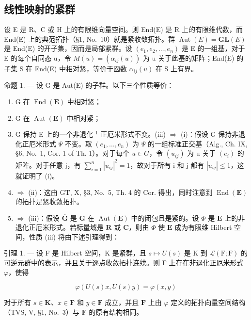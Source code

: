 \subsection{线性映射的紧群}

设 E 是 R、C 或 H 上的有限维向量空间。则 End(E) 是 R 上的有限维代数，而 End(E) 上的典范拓扑（§1, No.~10）就是紧收敛拓扑。群 \(\operatorname{Aut}(E) = \mathbf{GL}(E)\) 是 End(E) 的开子集，因而是局部紧群。设 \((e_{1}, e_{2}, \ldots, e_{n})\) 是 E 的一组基，对于 E 的每个自同态 u，令 \(M(u) = (\alpha_{ij}(u))\) 为 u 关于此基的矩阵；End(E) 的子集 S 在 End(E) 中相对紧，等价于函数 \(\alpha_{ij}(u)\) 在 S 上有界。

命题 1. --- 设 G 是 Aut(E) 的子群。以下三个性质等价：

\begin{enumerate}
\def\labelenumi{(\roman{enumi})}
\item
  G 在 \(\operatorname{End}(\mathbf{E})\) 中相对紧；
\item
  G 在 \(\operatorname{Aut}(\mathbf{E})\) 中相对紧；
\item
  G 保持 E 上的一个非退化 \(^{1}\) 正厄米形式不变。(iii) \(\Rightarrow\) (i)：假设 G 保持非退化正厄米形式 \(\Psi\) 不变。取 \((e_{1},\ldots,e_{n})\) 为 \(\Psi\) 的一组标准正交基（Alg., Ch. IX, §6, No.~1, Cor. 1 of Th. 1）。对于每个 \(u\in G\)，令 \((u_{ij})\) 为 u 关于 \((e_{i})\) 的矩阵。对于任意 j，有 \(\sum_{i=1}^{n}|u_{ij}|^{2}=1\)，故对于所有 i 和 j 都有 \(|u_{ij}|\leqslant1\)，这就证明了 (i)。
\item
  \(\Rightarrow\) (ii)：这由 GT, X, §3, No.~5, Th. 4 的 Cor. 得出，同时注意到 \(\operatorname{End}(\mathbf{E})\) 的拓扑是紧收敛拓扑。
\item
  \(\Rightarrow\) (iii)：假设 \(\overline{\mathbf{G}}\) 是 \(\mathbf{G}\) 在 \(\operatorname{Aut}(\mathbf{E})\) 中的闭包且是紧的。设 \(\Phi\) 是 \(\mathbf{E}\) 上的非退化正厄米形式。若标量域是 \(\mathbf{R}\) 或 \(\mathbf{C}\)，则由 \(\Phi\) 使 \(\mathbf{E}\) 成为有限维 Hilbert 空间，性质 (iii) 将由下述引理得到：
\end{enumerate}

引理 1. --- 设 F 是 Hilbert 空间，K 是紧群，且 \(s \mapsto U(s)\) 是 K 到 \(\mathcal{L}(\mathrm{F};\mathrm{F})\) 的可逆元群中的表示，并且关于逐点收敛拓扑连续。则 F 上存在非退化正厄米形式 \(\varphi\)，使得

\[
\varphi (U (s) x, U (s) y) = \varphi (x, y)
\]

对于所有 \(s \in \mathbf{K}\)、\(x \in \mathbf{F}\) 和 \(y \in \mathbf{F}\) 成立，并且 \(\mathbf{F}\) 上由 \(\varphi\) 定义的拓扑向量空间结构（TVS, V, §1, No.~3）与 \(\mathbf{F}\) 的原有结构相同。

